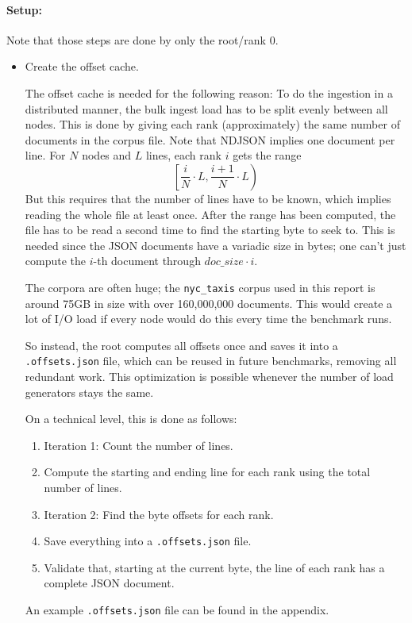 \paragraph{Setup:}
Note that those steps are done by only the root/rank 0.
\begin{itemize}
  \item Create the offset cache.

    The offset cache is needed for the following reason: To do the ingestion in a distributed manner, the bulk ingest load has to be split evenly between all nodes. This is done by giving each rank (approximately) the same number of documents in the corpus file. Note that \ac{NDJSON} implies one document per line. For $N$ nodes and $L$ lines, each rank $i$ gets the range
    \[
      \left[ \frac{i}{N} \cdot L, \frac{i+1}{N} \cdot L \right)
    \]
    But this requires that the number of lines have to be known, which implies reading the whole file at least once. After the range has been computed, the file has to be read a second time to find the starting byte to seek to. This is needed since the \ac{JSON} documents have a variadic size in bytes; one can't just compute the $i$-th document through $doc\_size \cdot i$.

    The corpora are often huge; the \texttt{nyc\_taxis} corpus used in this report is around 75GB in size with over 160,000,000 documents. This would create a lot of I/O load if every node would do this every time the benchmark runs.

    So instead, the root computes all offsets once and saves it into a \texttt{.offsets.json} file, which can be reused in future benchmarks, removing all redundant work. This optimization is possible whenever the number of load generators stays the same.

    On a technical level, this is done as follows:
    \begin{enumerate}
      \item Iteration 1: Count the number of lines.
      \item Compute the starting and ending line for each rank using the total number of lines.
      \item Iteration 2: Find the byte offsets for each rank.
      \item Save everything into a \texttt{.offsets.json} file.
      \item Validate that, starting at the current byte, the line of each rank has a complete \ac{JSON} document.
    \end{enumerate}
    An example \texttt{.offsets.json} file can be found in the appendix.


\end{itemize}
